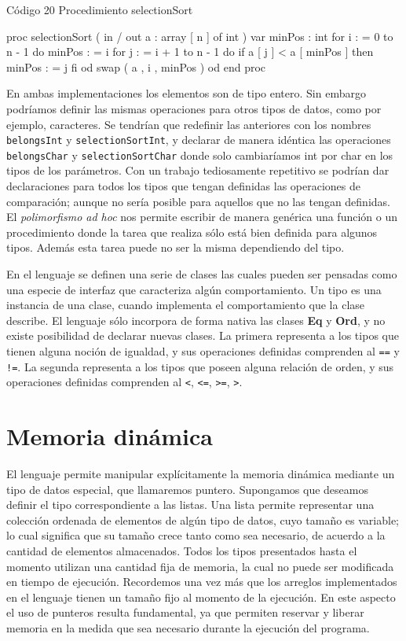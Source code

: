 \begin{codebox}{Código 20}
\footnotesize Procedimiento selectionSort
\tcblower
\begin{pascallike}
proc selectionSort ( in / out a : array [ n ] of int )
var minPos : int
    for i : = 0 to n - 1 do
        minPos : = i
        for j : = i + 1 to n - 1 do
            if a [ j ] < a [ minPos ] then minPos : = j fi
        od
        swap ( a , i , minPos )
    od
end proc
\end{pascallike}
\end{codebox}
En ambas implementaciones los elementos son de tipo entero. Sin embargo podríamos definir las mismas operaciones para otros tipos de datos, como por ejemplo, caracteres. Se tendrían que redefinir las anteriores con los nombres \texttt{belongsInt} y \texttt{selectionSortInt}, y declarar de manera idéntica las operaciones \texttt{belongsChar} y \texttt{selectionSortChar} donde solo cambiaríamos int por char en los tipos de los parámetros. Con un trabajo tediosamente repetitivo se podrían dar declaraciones para todos los tipos que tengan definidas las operaciones de comparación; aunque no sería posible para aquellos que no las tengan definidas. El \textit{polimorfismo ad hoc} nos permite escribir de manera genérica una función o un procedimiento donde la tarea que realiza sólo está bien definida para algunos tipos. Además esta tarea puede no ser la misma dependiendo del tipo.

En el lenguaje se definen una serie de clases las cuales pueden ser pensadas como una especie de interfaz que caracteriza algún comportamiento. Un tipo es una instancia de una clase, cuando implementa el comportamiento que la clase describe. El lenguaje sólo incorpora de forma nativa las clases \textbf{Eq} y \textbf{Ord}, y no existe posibilidad de declarar nuevas clases. La primera representa a los tipos que tienen alguna noción de igualdad, y sus operaciones definidas comprenden al \texttt{==} y \texttt{!=}. La segunda representa a los tipos que poseen alguna relación de orden, y sus operaciones definidas comprenden al \texttt{<}, \texttt{<=}, \texttt{>=}, \texttt{>}.

\section{Memoria dinámica}
El lenguaje permite manipular explícitamente la memoria dinámica mediante un tipo de datos especial, que llamaremos puntero. Supongamos que deseamos definir el tipo correspondiente a las listas. Una lista permite representar una colección ordenada de elementos de algún tipo de datos, cuyo tamaño es variable; lo cual significa que su tamaño crece tanto como sea necesario, de acuerdo a la cantidad de elementos almacenados. Todos los tipos presentados hasta el momento utilizan una cantidad fija de memoria, la cual no puede ser modificada en tiempo de ejecución. Recordemos una vez más que los arreglos implementados en el lenguaje tienen un tamaño fijo al momento de la ejecución. En este aspecto el uso de punteros resulta fundamental, ya que permiten reservar y liberar memoria en la medida que sea necesario durante la ejecución del programa.

